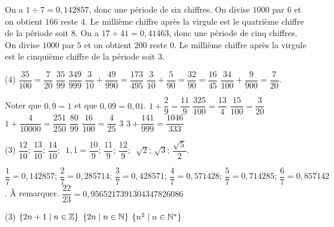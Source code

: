 \documentclass[a4paper,12pt]{report}
\begin{document}
\vspace*{-2\baselineskip}
\begin{core}
	\phantom{.}
	\begin{tasks}
		\task On a $1\div 7=0,\overline{142857}$, donc une période de six chiffres. On divise $1000$ par $6$ et on obtient $166$ reste $4$. Le millième chiffre après la virgule est le quatrième chiffre de la période soit $8$. 
		\task On a $17\div 41=0,\overline{41463}$, donc une période de cinq chiffres. On divise $1000$ par $5$ et on obtient $200$ reste $0$. Le millième chiffre après la virgule est le cinquième chiffre de la période soit $3$. 
	\end{tasks}
\end{core}
\begin{core}
	\phantom{.}
\begin{tasks}(4)
	\task $\dfrac{35}{100}=\dfrac{7}{20}$
	\task $\dfrac{35}{99}$
	\task $\dfrac{349}{999}$
	\task $\dfrac{3}{10}+\dfrac{49}{990}=\dfrac{173}{495}$
	\task $\dfrac{3}{10}+\dfrac{5}{90}=\dfrac{32}{90}=\dfrac{16}{45}$
	\task $\dfrac{34}{100}+\dfrac{9}{900}=\dfrac{7}{20}$. 

	Noter que $0,\overline{9}=1$ et que $0,0\overline{9}=0,01$.
	\task $1+\dfrac{2}{9}=\dfrac{11}{9}$
	\task $\dfrac{325}{100}=\dfrac{13}{4}$
	\task $\dfrac{15}{100}=\dfrac{3}{20}$
	\task $1+\dfrac{4}{10000}=\dfrac{251}{250}$
	\task $\dfrac{80}{99}$
	\task $\dfrac{16}{100}=\dfrac{4}{25}$
	\task $3$
	\task $3+\dfrac{141}{999}=\dfrac{1046}{333}$
\end{tasks}
\end{core}
\begin{core}
	\phantom{.}
	\begin{tasks}(3)
		\task $\dfrac{12}{10};\, \dfrac{13}{10};\,\dfrac{14}{10};\,$
		\task $1,\overline{1}=\dfrac{10}{9};\, \dfrac{11}{9};\, \dfrac{12}{9};\,$
		\task $\sqrt{2};\, \sqrt{3};\, \dfrac{\sqrt{5}}{2}.$	
	\end{tasks}
\end{core}
\begin{core}
	\phantom{.}
	\begin{tasks}
		\task $\dfrac{1}{7}=0,\overline{142857};\,\dfrac{2}{7}=0,\overline{285714};\,\dfrac{3}{7}=0,\overline{428571};\,\dfrac{4}{7}=0,\overline{571428};\,\dfrac{5}{7}=0,\overline{714285};\,\dfrac{6}{7}=0,\overline{857142}$.
		\task À remarquer.
		\task $\dfrac{22}{23}=0,\overline{9565217391304347826086}$
	\end{tasks}
\end{core}
\begin{core}
	\phantom{.}
	\begin{tasks}(3)
		\task $\{2n+1 \mid n\in \mathbb Z\}$
		\task $\{2n \mid n\in \mathbb N\}$
		\task $\{n^2 \mid n\in \mathbb N^*\}$
	\end{tasks}
\end{core}
\end{document}
